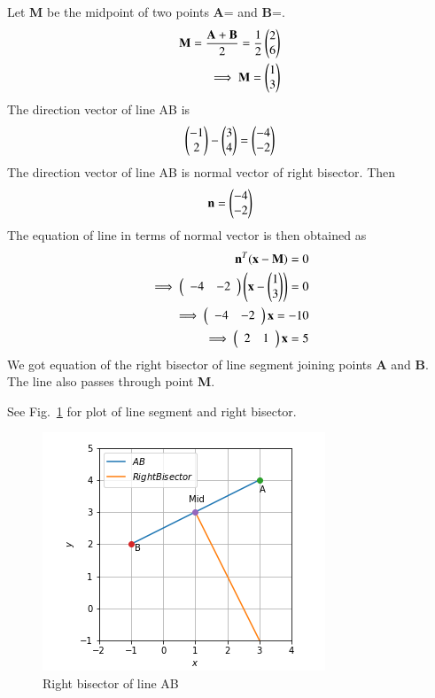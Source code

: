 
Let \textbf{M} be the midpoint of two points \textbf{A}= and \textbf{B}=.
\begin{align}
    \mathbf{M}=\frac{\mathbf{A}+\mathbf{B}}{2}=\frac{1}{2}\begin{pmatrix}2\\6\end{pmatrix}\\
    \implies\mathbf{M}=\begin{pmatrix}1\\3\end{pmatrix}\nonumber
\end{align}
The direction vector of line AB is
\begin{align}
    \begin{pmatrix}-1\\2\end{pmatrix}-\begin{pmatrix}3\\4\end{pmatrix}=\begin{pmatrix}-4\\-2\end{pmatrix}
\end{align}
The direction vector of line AB is normal vector of right bisector. Then
\begin{align}
    \mathbf{n}=\begin{pmatrix}-4\\-2\end{pmatrix}
\end{align}
The equation of line in terms of normal vector is then obtained as
\begin{align}
    \mathbf{n}^T(\mathbf{x}-\mathbf{M})=0\\
    \implies\left(\begin{array}{cc}-4 & -2\end{array}\right)\left(\mathbf{x}-\begin{pmatrix}1\\3\end{pmatrix}\right) = 0\\
    \implies\left(\begin{array}{cc}-4 & -2\end{array}\right)\mathbf{x} = -10\\
    \implies\left(\begin{array}{cc}2 & 1\end{array}\right)\mathbf{x} = 5
\end{align}
We got equation of the right bisector of line segment joining points \textbf{A} and \textbf{B}. The line also passes through point \textbf{M}.

See Fig.~\ref{fig:sol_line_plane_41_figure1} for plot of line segment and right bisector.
\begin{figure}[ht!]
    \centering
    \includegraphics[width=\columnwidth]{./solutions/line_plane/41/Figure_1}
    \caption{Right bisector of line AB}
    \label{fig:sol_line_plane_41_figure1}
\end{figure}
